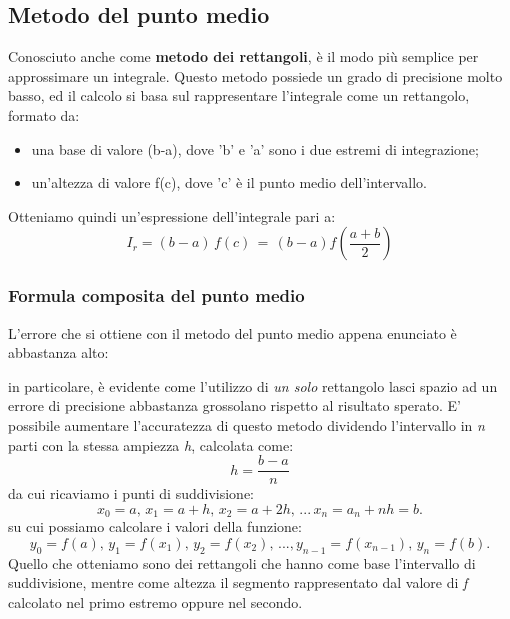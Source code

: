 \documentclass{article}
\begin{document}
\subsection{Metodo del punto medio}
Conosciuto anche come \textbf{metodo dei rettangoli}, è il modo più semplice per approssimare un integrale.
Questo metodo possiede un grado di precisione molto basso, ed il calcolo si basa sul rappresentare l'integrale come un rettangolo, formato da:
\begin{itemize}
   \item una base di valore (b-a), dove 'b' e 'a' sono i due estremi di integrazione;
   \item un'altezza di valore f(c), dove 'c' è il punto medio dell'intervallo.
\end{itemize}
Otteniamo quindi un'espressione dell'integrale pari a:
\begin{equation*}
   I_{r} = (b-a)\,f(c)\,=\,(b-a)f \left( \frac{a+b}{2}  \right)
\end{equation*}
\subsubsection{Formula composita del punto medio}
L'errore che si ottiene con il metodo del punto medio appena enunciato è abbastanza alto:

in particolare, è evidente come l'utilizzo di \textit{un solo} rettangolo lasci spazio ad un errore di precisione abbastanza grossolano rispetto al risultato sperato.
E' possibile aumentare l'accuratezza di questo metodo dividendo l'intervallo in \textit{n} parti con  la stessa ampiezza \textit{h}, calcolata come:
\begin{equation*}
   h = \frac{b-a}{n}
\end{equation*}
da cui ricaviamo i punti di suddivisione:
\begin{equation*}
   x_0 = a,\,x_1 = a+h,\, x_2 = a + 2h,\,...\,x_n = a_n + nh = b.
\end{equation*}
su cui possiamo calcolare i valori della funzione:
\begin{equation*}
   y_0 = f(a),\,y_1 = f(x_1),\,y_2 = f(x_2),\,...,y_{n-1} = f(x_{n-1}),\,y_n = f(b).
\end{equation*}
Quello che otteniamo sono dei rettangoli che hanno come base l'intervallo di suddivisione, mentre come altezza il segmento rappresentato dal valore di \textit{f} calcolato 
nel primo estremo oppure nel secondo.
\end{document}
